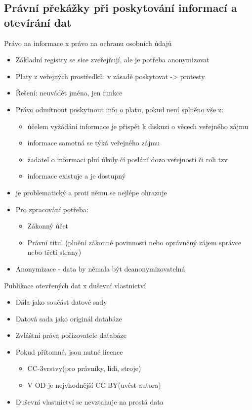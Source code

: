\subsection{Právní překážky při poskytování informací a otevírání dat}
Právo na informace x právo na ochranu osobních údajů
\begin{itemize}
    \item Základní registry se sice zveřejňují, ale je potřeba anonymizovat
    \item Platy z veřejných prostředků: v zásadě poskytovat -> protesty 
    \item Řešení: neuvádět jména, jen funkce
    \item Právo odmítnout poskytnout info o platu, pokud není splněno vše z:
    \begin{itemize}
        \item účelem vyžádání informace je přispět k diskuzi o věcech veřejného zájmu
        \item informace samotná se týká veřejného zájmu
        \item žadatel o informaci plní úkoly čí poslání dozo veřejnosti či roli tzv 
        \item informace existuje a je dostupný
    \end{itemize}
    \item {} je problematický a proti němu se nejlépe ohrazuje
    \item Pro zpracování potřeba:
    \begin{itemize}
        \item  Zákonný účet
        \item Právní titul (plnění zákonné povinnosti nebo oprávněný zájem správce nebo třetí
strany)
    \end{itemize}
    \item Anonymizace - data by němala být deanonymizovatelná
\end{itemize}
Publikace otevřených dat x duševní vlastnictví
\begin{itemize}
    \item Dála jako součást datové sady
    \item Datová sada jako originál databáze
    \item Zvláštní práva pořizovatele databáze
    \item Pokud přítomné, jsou nutné licence
    \begin{itemize}
        \item CC-3vrstvy(pro právníky, lidi, stroje)
        \item V OD je nejvhodnější CC BY(uvést autora)
    \end{itemize}
    \item Duševní vlastnictví se nevztahuje na prostá data
\end{itemize}
